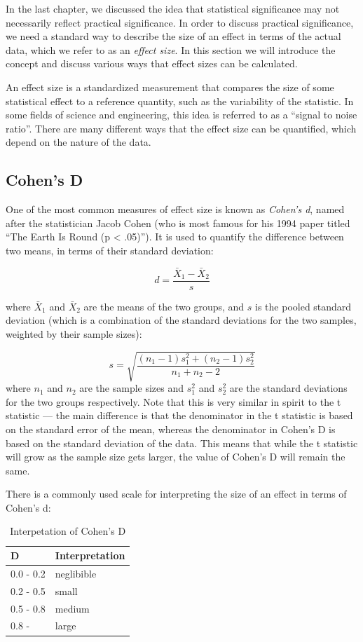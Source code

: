 \documentclass[12pt,]{book}
\begin{document}
In the last chapter, we discussed the idea that statistical significance may not necessarily reflect practical significance. In order to discuss practical significance, we need a standard way to describe the size of an effect in terms of the actual data, which we refer to as an \emph{effect size}. In this section we will introduce the concept and discuss various ways that effect sizes can be calculated.

An effect size is a standardized measurement that compares the size of some statistical effect to a reference quantity, such as the variability of the statistic. In some fields of science and engineering, this idea is referred to as a ``signal to noise ratio''. There are many different ways that the effect size can be quantified, which depend on the nature of the data.

\hypertarget{cohens-d}{%
\subsection{Cohen's D}\label{cohens-d}}

One of the most common measures of effect size is known as \emph{Cohen's d}, named after the statistician Jacob Cohen (who is most famous for his 1994 paper titled ``The Earth Is Round (p \textless{} .05)''). It is used to quantify the difference between two means, in terms of their standard deviation:

\[
d = \frac{\bar{X}_1 - \bar{X}_2}{s}
\]

where \(\bar{X}_1\) and \(\bar{X}_2\) are the means of the two groups, and \(s\) is the pooled standard deviation (which is a combination of the standard deviations for the two samples, weighted by their sample sizes):

\[
s = \sqrt{\frac{(n_1 - 1)s^2_1 + (n_2 - 1)s^2_2 }{n_1 +n_2 -2}}
\]
where \(n_1\) and \(n_2\) are the sample sizes and \(s^2_1\) and \(s^2_2\) are the standard deviations for the two groups respectively. Note that this is very similar in spirit to the t statistic --- the main difference is that the denominator in the t statistic is based on the standard error of the mean, whereas the denominator in Cohen's D is based on the standard deviation of the data. This means that while the t statistic will grow as the sample size gets larger, the value of Cohen's D will remain the same.

There is a commonly used scale for interpreting the size of an effect in terms of Cohen's d:

\begin{table}

\caption{\label{tab:unnamed-chunk-125}Interpetation of Cohen's D}
\centering
\begin{tabular}[t]{l|l}
\hline
D & Interpretation\\
\hline
0.0 - 0.2 & neglibible\\
\hline
0.2 - 0.5 & small\\
\hline
0.5 - 0.8 & medium\\
\hline
0.8 - & large\\
\hline
\end{tabular}
\end{table}
\end{document}
